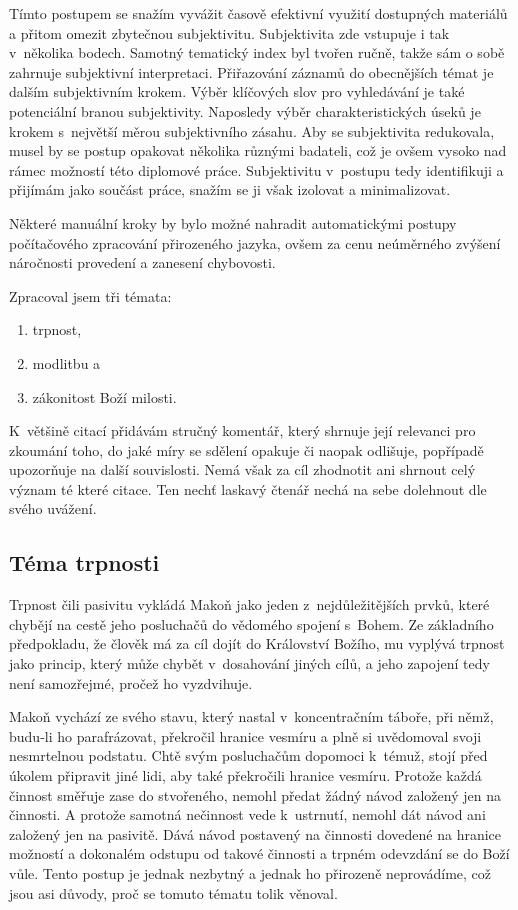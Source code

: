 Tímto postupem se snažím vyvážit časově efektivní využití dostupných materiálů a
přitom omezit zbytečnou subjektivitu. Subjektivita zde vstupuje i tak v~několika
bodech. Samotný tematický index byl tvořen ručně, takže sám o sobě zahrnuje
subjektivní interpretaci. Přiřazování záznamů do obecnějších témat je dalším
subjektivním krokem. Výběr klíčových slov pro vyhledávání je také potenciální
branou subjektivity. Naposledy výběr charakteristických úseků je krokem
s~největší měrou subjektivního zásahu. Aby se subjektivita redukovala, musel by
se postup opakovat několika různými badateli, což je ovšem vysoko nad rámec
možností této diplomové práce. Subjektivitu v~postupu tedy identifikuji a
přijímám jako součást práce, snažím se ji však izolovat a minimalizovat.

Některé manuální kroky by bylo možné nahradit automatickými postupy počítačového
zpracování přirozeného jazyka, ovšem za cenu neúměrného zvýšení náročnosti
provedení a zanesení chybovosti.

Zpracoval jsem tři témata:
\begin{enumerate}
\item{trpnost,}
\item{modlitbu a}
\item{zákonitost Boží milosti.}
\end{enumerate}
K~většině citací přidávám stručný komentář, který shrnuje její relevanci pro
zkoumání toho, do jaké míry se sdělení opakuje či naopak odlišuje, popřípadě
upozorňuje na další souvislosti. Nemá však za cíl zhodnotit ani
shrnout celý význam té které citace. Ten nechť laskavý čtenář nechá na sebe
dolehnout dle svého uvážení.

\subsection{Téma trpnosti}

Trpnost čili pasivitu vykládá Makoň jako jeden z~nejdůležitějších prvků, které
chybějí na cestě jeho posluchačů do vědomého spojení s~Bohem. Ze základního
předpokladu, že člověk má za cíl dojít do Království Božího, mu vyplývá trpnost
jako princip, který může chybět v~dosahování jiných cílů, a jeho zapojení tedy
není samozřejmé, pročež ho vyzdvihuje.

Makoň vychází ze svého stavu, který nastal v~koncentračním táboře, při němž,
budu-li ho parafrázovat, překročil hranice vesmíru a plně si uvědomoval svoji
nesmrtelnou podstatu. Chtě svým posluchačům dopomoci k~témuž, stojí před
úkolem připravit jiné lidi, aby také překročili hranice vesmíru. Protože každá
činnost směřuje zase do stvořeného, nemohl předat žádný návod založený jen na
činnosti. A protože samotná nečinnost vede k~ustrnutí, nemohl dát návod ani
založený jen na pasivitě. Dává návod postavený na činnosti dovedené na hranice
možností a dokonalém odstupu od takové činnosti a trpném odevzdání se do Boží
vůle. Tento postup je jednak nezbytný a jednak ho přirozeně neprovádíme, což
jsou asi důvody, proč se tomuto tématu tolik věnoval.

